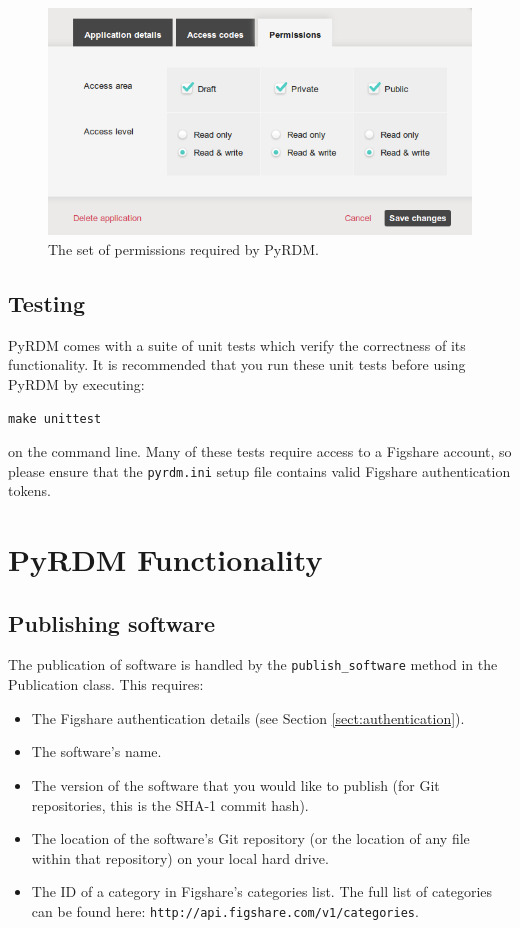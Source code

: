 \documentclass[a4paper,11pt]{report}
\begin{document}
\begin{figure}
  \centering
  \includegraphics[width=1\columnwidth]{images/permissions.png}
  \caption{The set of permissions required by PyRDM.}
  \label{fig:permissions}
\end{figure}

\section{Testing}
PyRDM comes with a suite of unit tests which verify the correctness of its functionality. It is recommended that you run these unit tests before using PyRDM by executing:

  \texttt{make unittest}
  
on the command line. Many of these tests require access to a Figshare account, so please ensure that the \texttt{pyrdm.ini} setup file contains valid Figshare authentication tokens.

\chapter{PyRDM Functionality}

\section{Publishing software}
The publication of software is handled by the \texttt{publish\_software} method in the Publication class. This requires:

\begin{itemize}
  \item The Figshare authentication details (see Section \ref{sect:authentication}).
  \item The software's name.
  \item The version of the software that you would like to publish (for Git repositories, this is the SHA-1 commit hash).
  \item The location of the software's Git repository (or the location of any file within that repository) on your local hard drive.
  \item The ID of a category in Figshare's categories list. The full list of categories can be found here: \texttt{http://api.figshare.com/v1/categories}.
\end{itemize}
\end{document}
